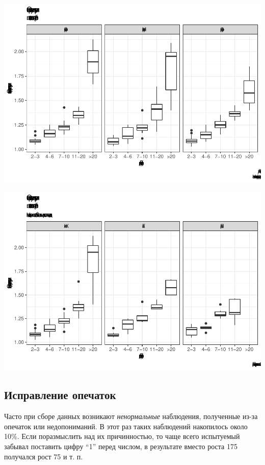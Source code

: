 \documentclass[
]{article}
\begin{document}
\begin{center}\includegraphics[width=0.85\linewidth]{Regression-model-for-estimating-RM_files/figure-latex/unnamed-chunk-25-2} \end{center}

\begin{center}\includegraphics[width=0.85\linewidth]{Regression-model-for-estimating-RM_files/figure-latex/unnamed-chunk-25-3} \end{center}

\hypertarget{ux438ux441ux43fux440ux430ux432ux43bux435ux43dux438ux435-ux43eux43fux435ux447ux430ux442ux43eux43a}{%
\subsection{Исправление
опечаток}\label{ux438ux441ux43fux440ux430ux432ux43bux435ux43dux438ux435-ux43eux43fux435ux447ux430ux442ux43eux43a}}

Часто при сборе данных возникают \emph{ненормальные} наблюдения,
полученные из-за опечаток или недопониманий. В этот раз таких наблюдений
накопилось около 10\%. Если поразмыслить над их причинностью, то чаще
всего испытуемый забывал поставить цифру ``1'' перед числом, в
результате вместо роста 175 получался рост 75 и т. п.
\end{document}

